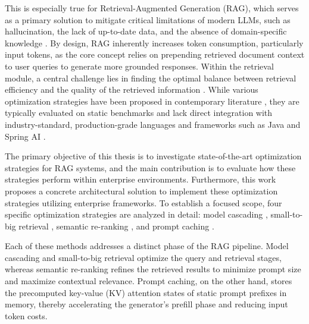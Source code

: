 This is especially true for Retrieval-Augmented Generation (RAG), which serves as a primary solution to mitigate critical limitations of modern LLMs, such as hallucination, the lack of up-to-date data, and the absence of domain-specific knowledge \citep{lewis2020rag, wu2025ragnlp}. By design, RAG inherently increases token consumption, particularly input tokens, as the core concept relies on prepending retrieved document context to user queries to generate more grounded responses. Within the retrieval module, a central challenge lies in finding the optimal balance between retrieval efficiency and the quality of the retrieved information \citep{wu2025ragnlp}. While various optimization strategies have been proposed in contemporary literature \citep{wu2025ragnlp, zhao2024ragandbeyond}, they are typically evaluated on static benchmarks and lack direct integration with industry-standard, production-grade languages and frameworks such as Java and Spring AI \citep{springai}.


The primary objective of this thesis is to investigate state-of-the-art optimization strategies for RAG systems, and the main contribution is to evaluate how these strategies perform within enterprise environments. Furthermore, this work proposes a concrete architectural solution to implement these optimization strategies utilizing enterprise frameworks. To establish a focused scope, four specific optimization strategies are analyzed in detail: model cascading \citep{chen2023frugalgpt}, small-to-big retrieval \citep{lumer2025rethinking}, semantic re-ranking \citep{yu2024rankrag}, and prompt caching \citep{gim2024promptcache}. 


Each of these methods addresses a distinct phase of the RAG pipeline. Model cascading and small-to-big retrieval optimize the query and retrieval stages, whereas semantic re-ranking refines the retrieved results to minimize prompt size and maximize contextual relevance. Prompt caching, on the other hand, stores the precomputed key-value (KV) attention states of static prompt prefixes in memory, thereby accelerating the generator's prefill phase and reducing input token costs.

